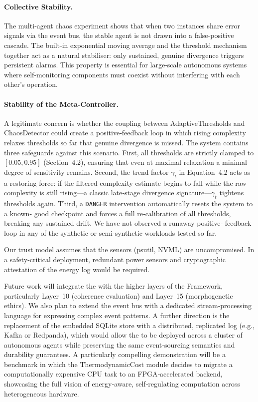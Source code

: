\paragraph{Collective Stability.}
The multi‑agent chaos experiment shows that when two \Core{} instances
share error signals via the event bus, the stable agent is not drawn
into a false‑positive cascade.  The built‑in exponential moving average
and the threshold mechanism together act as a natural stabiliser: only
sustained, genuine divergence triggers persistent alarms.  This
property is essential for large‑scale autonomous systems where
self‑monitoring components must coexist without interfering with each
other's operation.

\paragraph{Stability of the Meta‑Controller.}
A legitimate concern is whether the coupling between AdaptiveThresholds
and ChaosDetector could create a positive‑feedback loop in which rising
complexity relaxes thresholds so far that genuine divergence is missed.
The system contains three safeguards against this scenario.  First, all
thresholds are strictly clamped to $[0.05,0.95]$ (Section~4.2),
ensuring that even at maximal relaxation a minimal degree of sensitivity
remains.  Second, the trend factor $\gamma_t$ in Equation~4.2 acts as a
restoring force: if the filtered complexity estimate begins to fall
while the raw complexity is still rising—a classic late‑stage
divergence signature—$\gamma_t$ tightens thresholds again.  Third, a
\texttt{DANGER} intervention automatically resets the system to a known‑
good checkpoint and forces a full re‑calibration of all thresholds,
breaking any sustained drift.  We have not observed a runaway positive‑
feedback loop in any of the synthetic or semi‑synthetic workloads tested
so far.

Our trust model assumes that the sensors (psutil, NVML) are
uncompromised.  In a safety‑critical deployment, redundant power
sensors and cryptographic attestation of the energy log would be
required.

Future work will integrate the \Core{} with the higher layers of the
\Apeiron{} Framework, particularly Layer~10 (coherence evaluation) and
Layer~15 (morphogenetic ethics).  We also plan to extend the event bus
with a dedicated stream‑processing language for expressing complex
event patterns.  
A further direction is the replacement of the embedded SQLite store
with a distributed, replicated log (e.g., Kafka or Redpanda), which
would allow the \Core{} to be deployed across a cluster of autonomous
agents while preserving the same event‑sourcing semantics and
durability guarantees.
A particularly compelling demonstration will be a
benchmark in which the ThermodynamicCost module decides to migrate a
computationally expensive CPU task to an FPGA‑accelerated backend,
showcasing the full vision of energy‑aware, self‑regulating computation
across heterogeneous hardware.